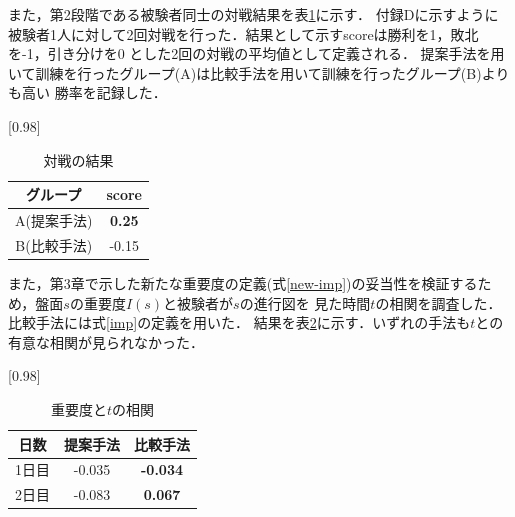 \begin{table}[H]
    \caption{先読み手数制限なしの場合}
    \scriptsize
    \centering
    \label{table:system-100}
\end{table}
また，第2段階である被験者同士の対戦結果を表\ref{table:result-battle}に示す．
付録Dに示すように被験者1人に対して2回対戦を行った．結果として示すscoreは勝利を1，敗北を-1，引き分けを0
とした2回の対戦の平均値として定義される．
提案手法を用いて訓練を行ったグループ(A)は比較手法を用いて訓練を行ったグループ(B)よりも高い
勝率を記録した．
\begin{table}[H]
	\caption{対戦の結果}
    \label{table:result-battle}
	\centering
	\scalebox{0.98}[0.98]{
		\begin{tabular}{c|c}
			グループ & score \\ \hline
			A(提案手法)    & \bf{0.25} \\ 
			B(比較手法)    & -0.15 \\
		\end{tabular}
	}
	
\end{table}
また，第3章で示した新たな重要度の定義(式\ref{new-imp})の妥当性を検証するため，盤面$s$の重要度$I(s)$と被験者が$s$の進行図を
見た時間$t$の相関を調査した．比較手法には式\ref{imp}の定義を用いた．
結果を表\ref{table:result-imp}に示す．いずれの手法も$t$との有意な相関が見られなかった．
\begin{table}[H]
	\caption{重要度と$t$の相関}
    \label{table:result-imp}
	\centering
	\scalebox{0.98}[0.98]{
		\begin{tabular}{c|c|c}
			日数& 提案手法 & 比較手法 \\ \hline
			1日目& {-0.035}& \bf{-0.034}\\
            2日目& {-0.083}& \bf{0.067}\\
		\end{tabular}
	}
	
\end{table}


